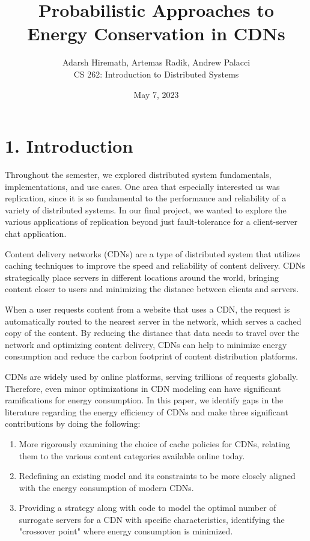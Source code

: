 \documentclass[
	a4paper, %
	10pt, %
	unnumberedsections, %
	twoside, %
]{LTJournalArticle}
\title{Probabilistic Approaches to 
\\ Energy Conservation in CDNs} %
\author{%
	Adarsh Hiremath, Artemas Radik, Andrew Palacci \\
	CS 262: Introduction to Distributed Systems \\
}
\date{May 7, 2023}
\begin{document}
\maketitle %


\section{1. Introduction}

Throughout the semester, we explored distributed system fundamentals, implementations, and use cases. One area that especially interested us was replication, since it is so fundamental to the performance and reliability of a variety of distributed systems. In our final project, we wanted to explore the various applications of replication beyond just fault-tolerance for a client-server chat application.

Content delivery networks (CDNs) are a type of distributed system that utilizes caching techniques to improve the speed and reliability of content delivery. CDNs strategically place servers in different locations around the world, bringing content closer to users and minimizing the distance between clients and servers.

When a user requests content from a website that uses a CDN, the request is automatically routed to the nearest server in the network, which serves a cached copy of the content. By reducing the distance that data needs to travel over the network and optimizing content delivery, CDNs can help to minimize energy consumption and reduce the carbon footprint of content distribution platforms.

CDNs are widely used by online platforms, serving trillions of requests globally. Therefore, even minor optimizations in CDN modeling can have significant ramifications for energy consumption. In this paper, we identify gaps in the literature regarding the energy efficiency of CDNs and make three significant contributions by doing the following:

\begin{enumerate}
    \item More rigorously examining the choice of cache policies for CDNs, relating them to the various content categories available online today.
    \item Redefining an existing model and its constraints to be more closely aligned with the energy consumption of modern CDNs.
    \item Providing a strategy along with code to model the optimal number of surrogate servers for a CDN with specific characteristics, identifying the "crossover point" where energy consumption is minimized.
\end{enumerate}
\end{document}
